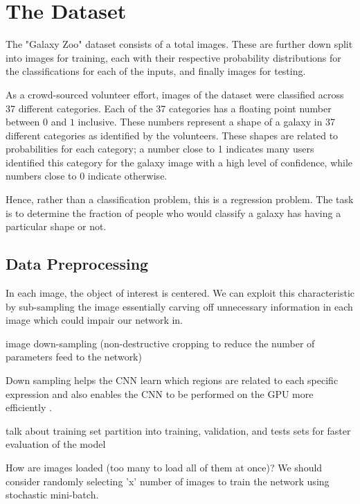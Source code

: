 \section{The Dataset}

The "Galaxy Zoo" dataset consists of a total  images. These are further down split into  images for training, each with their respective probability distributions for the classifications for each of the inputs, and finally  images for testing.

As a crowd-sourced volunteer effort, images of the dataset were classified across 37 different categories. Each of the 37 categories has a floating point number between $0$ and $1$ inclusive. These numbers represent a shape of a galaxy in 37 different categories as identified by the volunteers. These shapes are related to probabilities for each category; a number close to 1 indicates many users identified this category for the galaxy image with a high level of confidence, while numbers close to $0$ indicate otherwise.

Hence, rather than a classification problem, this is a regression problem. The task is to determine the fraction of people who would classify a galaxy has having a particular shape or not.

\subsection{Data Preprocessing}

In each image, the object of interest is centered. We can exploit this characteristic by sub-sampling the image essentially carving off unnecessary information in each image which could impair our network in.

image down-sampling (non-destructive cropping to reduce the number of parameters feed to the network)

Down sampling helps the CNN learn which regions are related to each specific expression and also enables the CNN to be performed on the GPU more efficiently \cite{deep-learning-review}.

talk about training set partition into training, validation, and tests sets for faster evaluation of the model

How are images loaded (too many to load all of them at once)? We should consider randomly selecting 'x' number of images to train the network using stochastic mini-batch.
